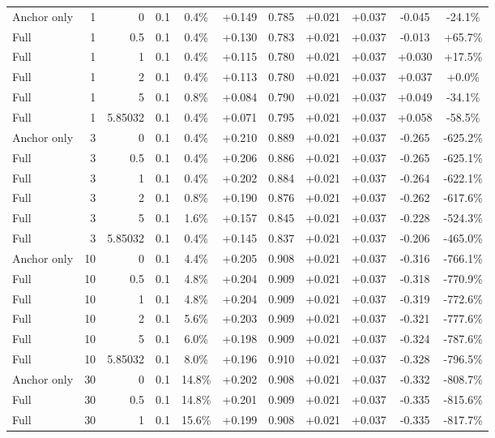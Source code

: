 \begin{table}[htbp]
\begin{tabular}{lrrrccccccc}
Anchor only & 1 & 0 & 0.1 & 0.4\% & +0.149 & 0.785 & +0.021 & +0.037 & -0.045 & -24.1\% \\
Full & 1 & 0.5 & 0.1 & 0.4\% & +0.130 & 0.783 & +0.021 & +0.037 & -0.013 & +65.7\% \\
Full & 1 & 1 & 0.1 & 0.4\% & +0.115 & 0.780 & +0.021 & +0.037 & +0.030 & +17.5\% \\
Full & 1 & 2 & 0.1 & 0.4\% & +0.113 & 0.780 & +0.021 & +0.037 & +0.037 & +0.0\% \\
Full & 1 & 5 & 0.1 & 0.8\% & +0.084 & 0.790 & +0.021 & +0.037 & +0.049 & -34.1\% \\
Full & 1 & 5.85032 & 0.1 & 0.4\% & +0.071 & 0.795 & +0.021 & +0.037 & +0.058 & -58.5\% \\
Anchor only & 3 & 0 & 0.1 & 0.4\% & +0.210 & 0.889 & +0.021 & +0.037 & -0.265 & -625.2\% \\
Full & 3 & 0.5 & 0.1 & 0.4\% & +0.206 & 0.886 & +0.021 & +0.037 & -0.265 & -625.1\% \\
Full & 3 & 1 & 0.1 & 0.4\% & +0.202 & 0.884 & +0.021 & +0.037 & -0.264 & -622.1\% \\
Full & 3 & 2 & 0.1 & 0.8\% & +0.190 & 0.876 & +0.021 & +0.037 & -0.262 & -617.6\% \\
Full & 3 & 5 & 0.1 & 1.6\% & +0.157 & 0.845 & +0.021 & +0.037 & -0.228 & -524.3\% \\
Full & 3 & 5.85032 & 0.1 & 0.4\% & +0.145 & 0.837 & +0.021 & +0.037 & -0.206 & -465.0\% \\
Anchor only & 10 & 0 & 0.1 & 4.4\% & +0.205 & 0.908 & +0.021 & +0.037 & -0.316 & -766.1\% \\
Full & 10 & 0.5 & 0.1 & 4.8\% & +0.204 & 0.909 & +0.021 & +0.037 & -0.318 & -770.9\% \\
Full & 10 & 1 & 0.1 & 4.8\% & +0.204 & 0.909 & +0.021 & +0.037 & -0.319 & -772.6\% \\
Full & 10 & 2 & 0.1 & 5.6\% & +0.203 & 0.909 & +0.021 & +0.037 & -0.321 & -777.6\% \\
Full & 10 & 5 & 0.1 & 6.0\% & +0.198 & 0.909 & +0.021 & +0.037 & -0.324 & -787.6\% \\
Full & 10 & 5.85032 & 0.1 & 8.0\% & +0.196 & 0.910 & +0.021 & +0.037 & -0.328 & -796.5\% \\
Anchor only & 30 & 0 & 0.1 & 14.8\% & +0.202 & 0.908 & +0.021 & +0.037 & -0.332 & -808.7\% \\
Full & 30 & 0.5 & 0.1 & 14.8\% & +0.201 & 0.909 & +0.021 & +0.037 & -0.335 & -815.6\% \\
Full & 30 & 1 & 0.1 & 15.6\% & +0.199 & 0.908 & +0.021 & +0.037 & -0.335 & -817.7\% \\

\end{tabular}
\end{table}
